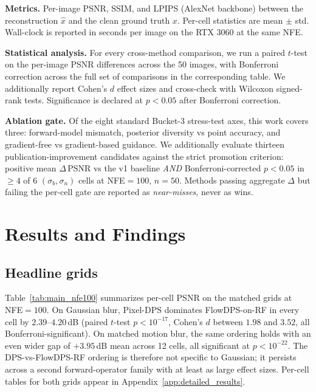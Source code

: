 \documentclass{article}
\begin{document}
\textbf{Metrics.} Per-image PSNR, SSIM, and LPIPS (AlexNet backbone)
between the reconstruction $\hat x$ and the clean ground truth $x$.
Per-cell statistics are mean $\pm$ std. Wall-clock is reported in
seconds per image on the RTX 3060 at the same NFE.

\textbf{Statistical analysis.} For every cross-method comparison, we
run a paired $t$-test on the per-image PSNR differences across the 50
images, with Bonferroni correction across the full set of comparisons
in the corresponding table. We additionally report Cohen's $d$ effect
sizes and cross-check with Wilcoxon signed-rank tests. Significance is
declared at $p<0.05$ after Bonferroni correction.

\textbf{Ablation gate.} Of the eight standard Bucket-3 stress-test
axes, this work covers three: forward-model mismatch, posterior
diversity vs point accuracy, and gradient-free vs gradient-based
guidance. We additionally evaluate thirteen publication-improvement
candidates against the strict promotion criterion: positive mean
$\Delta$\,PSNR vs the v1 baseline \emph{AND} Bonferroni-corrected
$p<0.05$ in $\geq 4$ of $6$ $(\sigma_b, \sigma_n)$ cells at NFE${=}100$,
$n{=}50$. Methods passing aggregate $\Delta$ but failing the per-cell
gate are reported as \emph{near-misses}, never as wins.

\section{Results and Findings}

\subsection{Headline grids}

Table~\ref{tab:main_nfe100} summarizes per-cell PSNR on the matched
grids at NFE${=}100$. On Gaussian blur, Pixel-DPS dominates FlowDPS-on-RF
in every cell by $2.39$--$4.20$\,dB (paired $t$-test
$p<10^{-17}$, Cohen's $d$ between $1.98$ and $3.52$, all
Bonferroni-significant). On matched motion blur, the same ordering
holds with an even wider gap of $+3.95$\,dB mean across 12 cells, all
significant at $p<10^{-22}$. The DPS-vs-FlowDPS-RF ordering is
therefore not specific to Gaussian; it persists across a second
forward-operator family with at least as large effect sizes.
Per-cell tables for both grids appear in
Appendix~\ref{app:detailed_results}.
\end{document}
